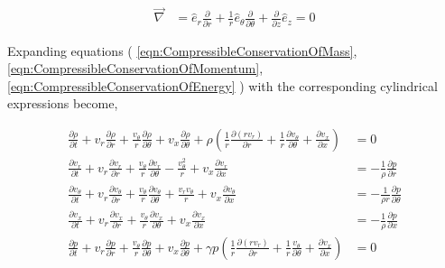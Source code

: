 \begin{align}
	\vec{\nabla} 
	&= \hat{e}_r \frac{\partial} {\partial r} + 
	\frac{1}{r} \hat{e}_{\theta}   
	\frac{\partial} {\partial \theta} + 
	\frac{\partial }{\partial z} \hat{e}_z = 0
    \label{eqn:NablaInCylindrical}
\end{align}

Expanding equations
(
\ref{eqn:CompressibleConservationOfMass},
\ref{eqn:CompressibleConservationOfMomentum},
\ref{eqn:CompressibleConservationOfEnergy}
) with the corresponding cylindrical expressions become, 

\begin{align}
\frac{\partial \rho}{\partial t} + %
v_r \frac{\partial \rho}{\partial r} +
\frac{v_{\theta}   }{r}
\frac{\partial \rho}{\partial \theta} +
v_x \frac{\partial \rho}{\partial \theta} + 
\rho 
\left(
\frac{1}{r} \frac{\partial (rv_r)	}{\partial r} +
\frac{1}{r}	\frac{\partial v_{\theta}}{\partial \theta} +
\frac{\partial v_x}{\partial x}
\right) 
&= 0 \\%
\frac{\partial v_r}{\partial t} + 
v_r \frac{\partial v_r}{\partial r} +
\frac{v_{\theta}  }{r}
\frac{\partial v_r}{\partial \theta}- \frac{v_{\theta}^2}{r}+ 
v_x \frac{\partial v_r}{\partial x} 
&= -\frac{1}{\rho} \frac{\partial p}{\partial r}\\  
\frac{\partial v_{\theta}}{\partial t} + 
v_r \frac{\partial v_{\theta}}{\partial r} +
\frac{v_{\theta}}{r}
\frac{\partial v_{\theta}}{\partial \theta} +
\frac{v_r v_{\theta}}{r}+ 
v_x \frac{\partial v_{\theta}}{\partial x} 
&= -\frac{1}{\rho r} \frac{\partial p}{\partial \theta}\\ 
\frac{\partial v_{x}}{\partial t} + 
v_r 
\frac{\partial v_x}{\partial r} +
\frac{v_{\theta}}{r}
\frac{\partial v_x}{\partial \theta}+ 
v_x \frac{\partial v_x}{\partial x} 
&= 
-\frac{1}{\rho } 
\frac{\partial p}{\partial x}\\  
\frac{\partial p }{\partial t} +
v_r 
\frac{\partial p}{\partial r} +
\frac{v_{\theta}}{r}
\frac{\partial p}{\partial \theta} +
v_x \frac{\partial p}{\partial \theta} + 
\gamma p 
\left(
\frac{1}{r}\frac{\partial (rv_r)}{\partial r} +
\frac{1}{r}\frac{v_{\theta}}{\partial \theta} +
\frac{\partial v_x}{\partial x}
\right) &= 0
\end{align}



